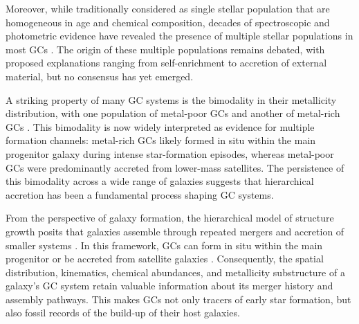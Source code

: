     Moreover, while traditionally considered as single stellar population that are homogeneous in age and chemical composition, decades of spectroscopic and photometric evidence have revealed the presence of multiple stellar populations in most GCs \citep{2008MNRAS.391..825D,2011ApJ...726...36C,2012A&ARv..20...50G,2018ARA&A..56...83B}. The origin of these multiple populations remains debated, with proposed explanations ranging from self-enrichment to accretion of external material, but no consensus has yet emerged.

    
    

    A striking property of many GC systems is the bimodality in their metallicity distribution, with one population of metal-poor GCs and another of metal-rich GCs \citep[e.g.,][]{2006ARA&A..44..193B, 2015ApJ...806...36H}. This bimodality is now widely interpreted as evidence for multiple formation channels: metal-rich GCs likely formed in situ within the main progenitor galaxy during intense star-formation episodes, whereas metal-poor GCs were predominantly accreted from lower-mass satellites. The persistence of this bimodality across a wide range of galaxies suggests that hierarchical accretion has been a fundamental process shaping GC systems.

    From the perspective of galaxy formation, the hierarchical model of structure growth posits that galaxies assemble through repeated mergers and accretion of smaller systems \citep{2015ARA&A..53...51S}. In this framework, GCs can form in situ within the main progenitor or be accreted from satellite galaxies \citep[e.g.,][]{2018MNRAS.479.4760F,2020MNRAS.498.2472K,2021ApJ...920...51M,2022ApJ...930L...9M,2023A&A...673A..86P,2024MNRAS.528.3198B,2025A&A...693A.155P}. Consequently, the spatial distribution, kinematics, chemical abundances, and metallicity substructure of a galaxy's GC system retain valuable information about its merger history and assembly pathways. This makes GCs not only tracers of early star formation, but also fossil records of the build-up of their host galaxies.


